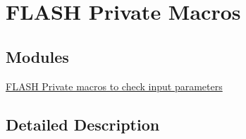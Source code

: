 \hypertarget{group___f_l_a_s_h___private___macros}{}\section{F\+L\+A\+SH Private Macros}
\label{group___f_l_a_s_h___private___macros}
\subsection*{Modules}
\begin{DoxyCompactItemize}
\item 
\hyperlink{group___f_l_a_s_h___i_s___f_l_a_s_h___definitions}{F\+L\+A\+S\+H Private macros to check input parameters}
\end{DoxyCompactItemize}


\subsection{Detailed Description}
